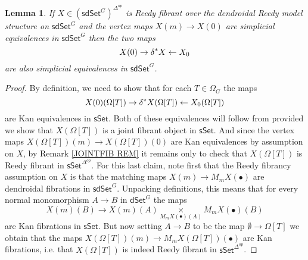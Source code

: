 \documentclass[a4paper,10pt
,draft
]{article}%
\numberwithin{equation}{section}
\numberwithin{figure}{section}
\newtheorem{lemma}[equation]{Lemma}%
\theoremstyle{definition} %
\newcommand{\1}{\ensuremath{\mathbbm 1}}%
\begin{document}
\begin{lemma}\label{DIAGWE LEM}
If $X \in (\mathsf{sdSet}^G)^{\Delta^{op}}$ is
Reedy fibrant 
over the dendroidal Reedy model structure 
on $\mathsf{sdSet}^G$
and the vertex maps 
$X(m) \to X(0)$ are simplicial equivalences in $\mathsf{sdSet}^G$
then the two maps
\[
X(0) \to \delta^{\**} X \leftarrow X_0
\]
are also simplicial equivalences in $\mathsf{sdSet}^G$.
\end{lemma}

\begin{proof}
By definition,
we need to show that for each $T \in \Omega_G$ the maps 
\[
	X(0)(\Omega[T]) \to 
	\delta^{\**} X (\Omega[T]) \leftarrow
	X_0 (\Omega[T])
\]	
are Kan equivalences in $\mathsf{sSet}$.
Both of these equivalences will follow from 
\cite[Prop. 4.5(iv)]{BP_edss}
provided we show that
$X(\Omega[T])$ is a joint fibrant object in $\mathsf{sSet}$.
And since the vertex maps 
$X(\Omega[T])(m) \to X(\Omega[T])(0)$
are Kan equivalences by assumption on $X$,
by Remark \ref{JOINTFIB REM} it remains only to check that
$X(\Omega[T])$
is Reedy fibrant in $\mathsf{sSet}^{\Delta^{op}}$.
For this last claim, 
note first that the Reedy fibrancy 
assumption on $X$ is that the matching maps 
$X(m) \to M_m X(\bullet)$
are dendroidal fibrations in 
$\mathsf{sdSet}^G$.
Unpacking definitions,
this means that for every normal monomorphism 
$A \to B$ in $\mathsf{dSet}^G$ the maps
\[
X(m)(B) \to 
X(m)(A) \underset{{M_m X(\bullet)(A)}}{\times} M_m X(\bullet)(B)
\]
are Kan fibrations in $\mathsf{sSet}$.
But now setting $A \to B$ to be the map $\emptyset \to \Omega[T]$
we obtain that the maps
$X(\Omega[T])(m) \to 
M_m X(\Omega[T])(\bullet)$
are Kan fibrations, i.e. that 
$X(\Omega[T])$ is indeed Reedy fibrant
in $\mathsf{sSet}^{\Delta^{op}}$.
\end{proof}
\end{document}

